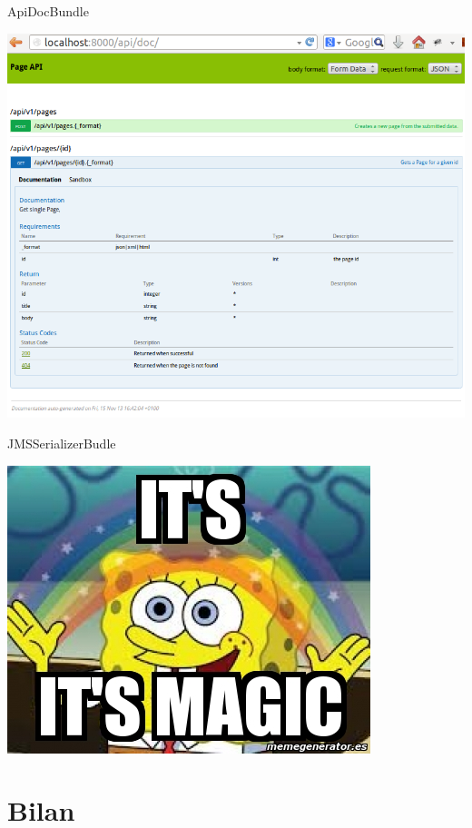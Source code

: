 \documentclass[12pt, francais]{beamer}
\begin{document}
\begin{frame}{ApiDocBundle}
	\begin{center}
		\includegraphics[width=.8\linewidth]{Pictures/apidoc.png}
	\end{center}

\end{frame}

\begin{frame}{JMSSerializerBudle}
	
\end{frame}


\begin{frame}
	
	
\end{frame}


\begin{frame}
	\begin{center}
		\includegraphics[width=.5\linewidth]{Pictures/magic.jpeg}
	\end{center}
\end{frame}


\begin{frame}
\end{frame}


\section{Bilan}



\begin{frame}
\end{frame}
\begin{frame}
\end{frame}
\end{document}
